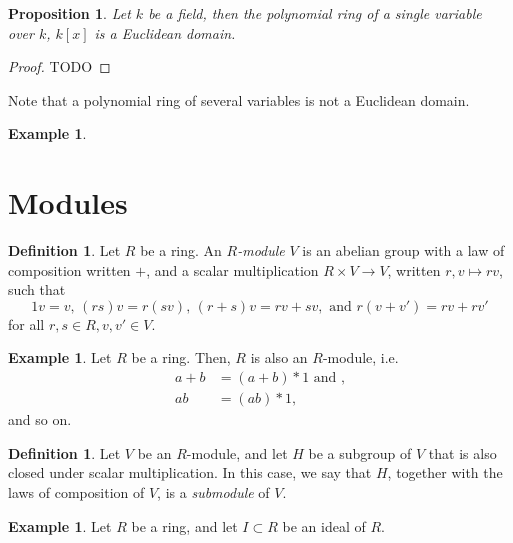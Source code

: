 \documentclass{amsart}
\newtheorem{proposition}[theorem]{Proposition}
\theoremstyle{definition}
\newtheorem{definition}[theorem]{Definition}
\newtheorem{example}[theorem]{Example}
\theoremstyle{remark}
\numberwithin{equation}{section}
\begin{document}
{\begin{proposition}
  Let $k$ be a field, then the polynomial ring of a single variable over $k$, $k[x]$ is a Euclidean domain.
\end{proposition}

\begin{proof}
  TODO
\end{proof}

Note that a polynomial ring of several variables is not a Euclidean domain.

\begin{example}
\end{example}

\section{Modules}
\label{sec:modules}

\begin{definition}
  Let $R$ be a ring. An \emph{$R$-module} $V$ is an abelian group with a law of composition written $+$, and a scalar multiplication $R \times V \to V$, written $r, v \mapsto rv$, such that
  \begin{equation}
  \label{eq:module-definition}
    1v = v \text{, } (rs)v = r(sv) \text{, } (r + s)v = rv + sv, \text{ and } r(v + v') = rv + rv'
  \end{equation}
  for all $r, s \in R, v, v' \in V$.
\end{definition}

\begin{example}
  Let $R$ be a ring. Then, $R$ is also an $R$-module, i.e.
  \begin{align*}
    a + b &= (a + b) * 1 \text{ and ,} \\
    ab &= (ab) * 1 \text{, }
  \end{align*}
  and so on.
\end{example}

\begin{definition}
  Let $V$ be an $R$-module, and let $H$ be a subgroup of $V$ that is also closed under scalar multiplication. In this case, we say that $H$, together with the laws of composition of $V$, is a \emph{submodule} of $V$.
\end{definition}


\begin{example}
  Let $R$ be a ring, and let $I \subset R$ be an ideal of $R$.


\end{example}}
\end{document}
